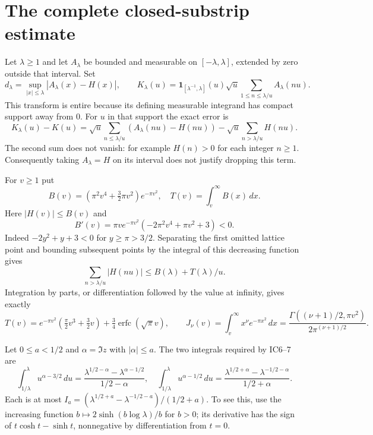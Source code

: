 \section{The complete closed-substrip estimate}
Let $\lambda\ge1$ and let $A_\lambda$ be bounded and measurable
on $[-\lambda,\lambda]$, extended by zero outside that interval.
Set
\[
 d_\lambda=\sup_{|x|\le\lambda}|A_\lambda(x)-H(x)|,\qquad
 K_\lambda(u)=\mathbf1_{[\lambda^{-1},\lambda]}(u)\sqrt u
       \sum_{1\le n\le\lambda/u}A_\lambda(nu).
\]
This transform is entire because its defining measurable integrand
has compact support away from $0$.
For $u$ in that support the exact error is
\begin{equation}\tag{IC6}
 K_\lambda(u)-K(u)
 =\sqrt u\sum_{n\le\lambda/u}(A_\lambda(nu)-H(nu))
   -\sqrt u\sum_{n>\lambda/u}H(nu).
\end{equation}
The second sum does not vanish: for example $H(n)>0$ for each
integer $n\ge1$. Consequently taking $A_\lambda=H$ on its interval
does not justify dropping this term.

For $v\ge1$ put
\[
 B(v)=(\pi^2v^4+\tfrac32\pi v^2)e^{-\pi v^2},\quad
 T(v)=\int_v^\infty B(x)\,dx.
\]
Here $|H(v)|\le B(v)$ and
\[
 B'(v)=\pi v e^{-\pi v^2}(-2\pi^2v^4+\pi v^2+3)<0.
\]
Indeed $-2y^2+y+3<0$ for $y\ge\pi>3/2$.
Separating the first omitted lattice point and bounding subsequent
points by the integral of this decreasing function gives
\begin{equation}\tag{IC7}
 \sum_{n>\lambda/u}|H(nu)|\le B(\lambda)+T(\lambda)/u.
\end{equation}
Integration by parts, or differentiation followed by the value at
infinity, gives exactly
\begin{equation}\tag{IC8}
 T(v)=e^{-\pi v^2}(\tfrac\pi2v^3+\tfrac32v)
       +\tfrac34\operatorname{erfc}(\sqrt\pi v),\qquad
 J_\nu(v)=\int_v^\infty x^\nu e^{-\pi x^2}\,dx
 =\frac{\Gamma((\nu+1)/2,\pi v^2)}{2\pi^{(\nu+1)/2}}.
\end{equation}

Let $0\le a<1/2$ and $\alpha=\Im z$ with $|\alpha|\le a$.
The two integrals required by IC6--7 are
\[
 \int_{1/\lambda}^{\lambda}u^{\alpha-3/2}\,du
 =\frac{\lambda^{1/2-\alpha}-\lambda^{\alpha-1/2}}{1/2-\alpha},
 \quad
 \int_{1/\lambda}^{\lambda}u^{\alpha-1/2}\,du
 =\frac{\lambda^{1/2+\alpha}-\lambda^{-1/2-\alpha}}{1/2+\alpha}.
\]
Each is at most
$I_a=(\lambda^{1/2+a}-\lambda^{-1/2-a})/(1/2+a)$.
To see this, use the increasing function
$b\mapsto2\sinh(b\log\lambda)/b$ for $b>0$; its derivative
has the sign of $t\cosh t-\sinh t$, nonnegative by differentiation
from $t=0$.

